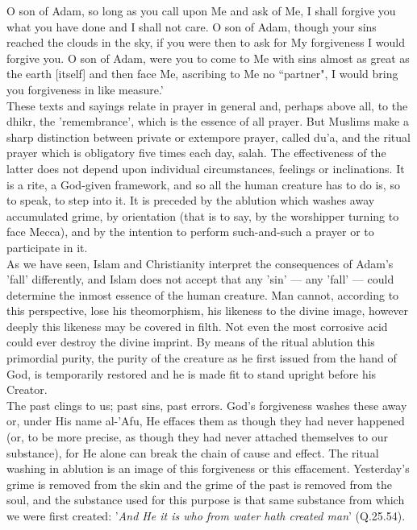 \documentclass[10pt, twoside,openright]{book}
\begin{document}
O son of Adam, so long as you call upon Me and ask of Me, I shall forgive you what you have done and 
I shall not care. O son of Adam, though your sins reached the clouds in the sky, if you were then to 
ask for My forgiveness I would forgive you. O son of Adam, were you to come to Me with sins almost as 
great as the earth [itself] and then face Me, ascribing to Me no ``partner", I would bring you 
forgiveness in like measure.' \\

These texts and sayings relate in prayer in general and, perhaps above all, to the dhikr, the 
'remembrance', which is the essence of all prayer. But Muslims make a sharp distinction between 
private or extempore prayer, called du'a, and the ritual prayer which is obligatory five times each 
day, salah. The effectiveness of the latter does not depend upon individual circumstances, feelings 
or inclinations. It is a rite, a God\hyp{}given framework, and so all the human creature has to do is, so 
to speak, to step into it. It is preceded by the ablution which washes away accumulated grime, by 
orientation (that is to say, by the worshipper turning to face Mecca), and by the intention to 
perform such\hyp{}and\hyp{}such a prayer or to participate in it. \\

As we have seen, Islam and Christianity interpret the consequences of Adam's 'fall' differently, and 
Islam does not accept that any 'sin' --- any 'fall' --- could determine the inmost essence of the human 
creature. Man cannot, according to this perspective, lose his theomorphism, his likeness to the 
divine image, however deeply this likeness may be covered in filth. Not even the most corrosive acid 
could ever destroy the divine imprint. By means of the ritual ablution this primordial purity, the 
purity of the creature as he first issued from the hand of God, is temporarily restored and he is 
made fit to stand upright before his Creator. \\

The past clings to us; past sins, past errors. God's forgiveness washes these away or, under His name 
al-'Afu, He effaces them as though they had never happened (or, to be more precise, as though they 
had never attached themselves to our substance), for He alone can break the chain of cause and 
effect. The ritual washing in ablution is an image of this forgiveness or this effacement. 
Yesterday's grime is removed from the skin and the grime of the past is removed from the soul, and 
the substance used for this purpose is that same substance from which we were first created: '\emph{And He 
it is who from water hath created man}' (Q.25.54). \\
\end{document}
